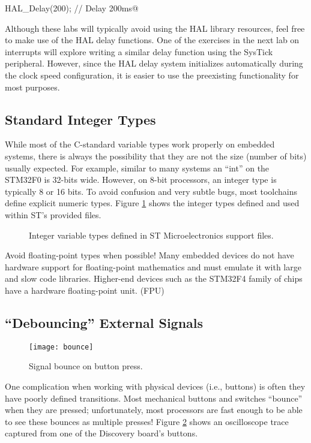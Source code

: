 \documentclass[openany,11pt,fleqn]{book} %
\makeatletter
\newcommand{\ilcode}[1]{
    \begin{center} \parskip=-15pt \colorbox{gray!20!white}{
        \parbox{\columnwidth-2\fboxsep}{
            \lstinline@#1@
        }
    } \end{center}
}
\newcommand{\code}[3]{
    \begin{figure}[]
        \begin{center}
            \hspace*{-3.4cm}
            \colorbox{gray!20!white}{
                \parbox{0.8\paperwidth} {
                    
                }
            }
            \caption{#2}
            \label{#3}
        \end{center}
    \end{figure}
}
\makeatother
\begin{document}
\ilcode{HAL_Delay(200); // Delay 200ms}

Although these labs will typically avoid using the HAL library resources, feel free to make use of the HAL delay functions. One of the exercises in the next lab on interrupts will explore writing a similar delay function using the SysTick peripheral. However, since the HAL delay system initializes automatically during the clock speed configuration, it is easier to use the preexisting functionality for most purposes. 
%
\subsection{\color{orange}Standard Integer Types}
%
While most of the C-standard variable types work properly on embedded systems, there is always the possibility that they are not the size (number of bits) usually expected. For example, similar to many systems an ``int'' on the STM32F0 is 32-bits wide. However, on 8-bit processors, an integer type is typically 8 or 16 bits. To avoid confusion and very subtle bugs, most toolchains define explicit numeric types. Figure \ref{types} shows the integer types defined and used within ST's provided files.
%
\code{./files/types.h}{Integer variable types defined in ST Microelectronics support files.}{types}
\begin{warning}
    Avoid floating-point types when possible! Many embedded devices do not have hardware support for floating-point mathematics and must emulate it with large and slow code libraries. Higher-end devices such as the STM32F4 family of chips have a hardware floating-point unit. (FPU) 
\end{warning}

\subsection{``Debouncing'' External Signals} \label{bounce_section}

\begin{figure}[]
    \centering\texttt{[image: bounce]}
    \caption{Signal bounce on button press.}
    \label{bounce}
\end{figure}

One complication when working with physical devices (i.e., buttons) is often they have poorly defined transitions. Most mechanical buttons and switches ``bounce'' when they are pressed; unfortunately, most processors are fast enough to be able to see these bounces as multiple presses! Figure \ref{bounce} shows an oscilloscope trace captured from one of the Discovery board's buttons.
\end{document}
